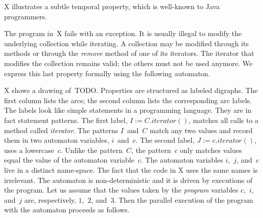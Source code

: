 \documentclass[preprint]{sigplanconf} %
\theoremstyle{definition}
\begin{document}

X illustrates a subtle temporal property, which is well-known to Java programmers.

The program in~X fails with an exception.
It is usually illegal to modify the underlying collection while iterating.
A collection may be modified through its methods or through the \textit{remove} method of one of its iterators.
The iterator that modifies the collection remains valid; the others must not be used anymore.
We express this last property formally using the following automaton.

X shows a drawing of~TODO.
Properties are structured as labeled digraphs.
The first column lists the arcs;
the second column lists the corresponding arc labels.
The labels look like simple statements in a programming language.
They are in fact statement patterns.
The first label, $I:=C.\mathit{iterator}()$, matches all calls to a method called \textit{iterator}.
The patterns $I$~and~$C$ match any two values and record them in two automaton variables, $i$~and~$c$.
The second label, $J:=c.\mathit{iterator}()$, uses a lowercase~$c$.
Unlike the pattern~$C$, the pattern~$c$ only matches values equal the value of the automaton variable~$c$.
The automaton variables $i$,~$j$, and~$c$ live in a distinct name-space.
The fact that the code in X uses the same names is irrelevant.
The automaton is non-deterministic and it is driven by executions of the program.
Let us assume that the values taken by the \emph{program} variables $c$,~$i$, and~$j$ are, respectively, $1$,~$2$, and~$3$.
Then the parallel execution of the program with the automaton proceeds as follows.
\end{document}
